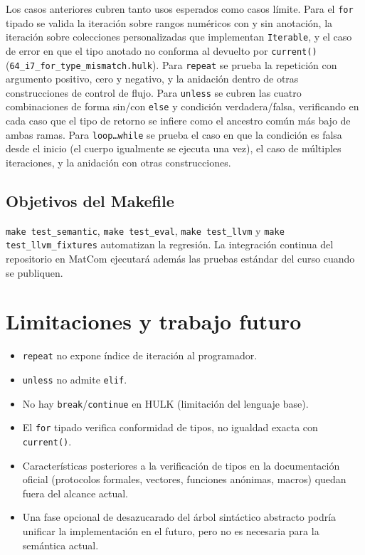 \documentclass[11pt,a4paper]{article}
\begin{document}
Los casos anteriores cubren tanto usos esperados como casos límite. Para el \texttt{for} tipado se valida la iteración sobre rangos numéricos con y sin anotación, la iteración sobre colecciones personalizadas que implementan \texttt{Iterable}, y el caso de error en que el tipo anotado no conforma al devuelto por \texttt{current()} (\texttt{64\_i7\_for\_type\_mismatch.hulk}). Para \texttt{repeat} se prueba la repetición con argumento positivo, cero y negativo, y la anidación dentro de otras construcciones de control de flujo. Para \texttt{unless} se cubren las cuatro combinaciones de forma sin/con \texttt{else} y condición verdadera/falsa, verificando en cada caso que el tipo de retorno se infiere como el ancestro común más bajo de ambas ramas. Para \texttt{loop\ldots while} se prueba el caso en que la condición es falsa desde el inicio (el cuerpo igualmente se ejecuta una vez), el caso de múltiples iteraciones, y la anidación con otras construcciones.

\subsection{Objetivos del Makefile}

\texttt{make test\_semantic}, \texttt{make test\_eval}, \texttt{make test\_llvm} y \texttt{make test\_llvm\_fixtures} automatizan la regresión. La integración continua del repositorio en MatCom ejecutará además las pruebas estándar del curso cuando se publiquen.

\section{Limitaciones y trabajo futuro}

\begin{itemize}
  \item \texttt{repeat} no expone índice de iteración al programador.
  \item \texttt{unless} no admite \texttt{elif}.
  \item No hay \texttt{break}/\texttt{continue} en HULK (limitación del lenguaje base).
  \item El \texttt{for} tipado verifica conformidad de tipos, no igualdad exacta con \texttt{current()}.
  \item Características posteriores a la verificación de tipos en la documentación oficial (protocolos formales, vectores, funciones anónimas, macros) quedan fuera del alcance actual.
  \item Una fase opcional de desazucarado del árbol sintáctico abstracto podría unificar la implementación en el futuro, pero no es necesaria para la semántica actual.
\end{itemize}
\end{document}
